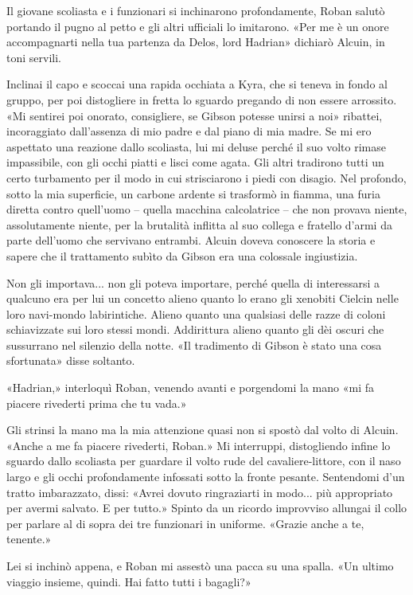 Il giovane scoliasta e i funzionari si inchinarono profondamente, Roban
salutò portando il pugno al petto e gli altri ufficiali lo imitarono.
«Per me è un onore accompagnarti nella tua partenza da Delos, lord
Hadrian» dichiarò Alcuin, in toni servili.

Inclinai il capo e scoccai una rapida occhiata a Kyra, che si teneva in
fondo al gruppo, per poi distogliere in fretta lo sguardo pregando di
non essere arrossito. «Mi sentirei poi onorato, consigliere, se Gibson
potesse unirsi a noi» ribattei, incoraggiato dall'assenza di mio padre e
dal piano di mia madre. Se mi ero aspettato una reazione dallo
scoliasta, lui mi deluse perché il suo volto rimase impassibile, con gli
occhi piatti e lisci come agata. Gli altri tradirono tutti un certo
turbamento per il modo in cui strisciarono i piedi con disagio. Nel
profondo, sotto la mia superficie, un carbone ardente si trasformò in
fiamma, una furia diretta contro quell'uomo -- quella macchina
calcolatrice -- che non provava niente, assolutamente niente, per la
brutalità inflitta al suo collega e fratello d'armi da parte dell'uomo
che servivano entrambi. Alcuin doveva conoscere la storia e sapere che
il trattamento subìto da Gibson era una colossale ingiustizia.

Non gli importava... non gli poteva importare, perché quella di
interessarsi a qualcuno era per lui un concetto alieno quanto lo erano
gli xenobiti Cielcin nelle loro navi-mondo labirintiche. Alieno quanto
una qualsiasi delle razze di coloni schiavizzate sui loro stessi mondi.
Addirittura alieno quanto gli dèi oscuri che sussurrano nel silenzio
della notte. «Il tradimento di Gibson è stato una cosa sfortunata» disse
soltanto.

«Hadrian,» interloquì Roban, venendo avanti e porgendomi la mano «mi fa
piacere rivederti prima che tu vada.»

Gli strinsi la mano ma la mia attenzione quasi non si spostò dal volto
di Alcuin. «Anche a me fa piacere rivederti, Roban.» Mi interruppi,
distogliendo infine lo sguardo dallo scoliasta per guardare il volto
rude del cavaliere-littore, con il naso largo e gli occhi profondamente
infossati sotto la fronte pesante. Sentendomi d'un tratto imbarazzato,
dissi: «Avrei dovuto ringraziarti in modo... più appropriato per avermi
salvato. E per tutto.» Spinto da un ricordo improvviso allungai il collo
per parlare al di sopra dei tre funzionari in uniforme. «Grazie anche a
te, tenente.»

Lei si inchinò appena, e Roban mi assestò una pacca su una spalla. «Un
ultimo viaggio insieme, quindi. Hai fatto tutti i bagagli?»

